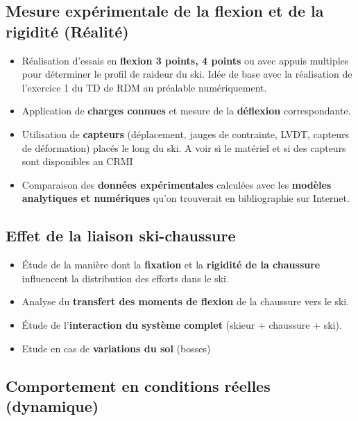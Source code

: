 \documentclass[12pt, a4paper]{article}
\begin{document}
\subsection{Mesure expérimentale de la flexion et de la rigidité (Réalité)}

\begin{itemize}
  \item Réalisation d'essais en \textbf{flexion 3 points, 4 points} ou avec appuis multiples pour déterminer le profil de raideur du ski. Idée de base avec la réalisation de l'exercice 1 du TD de RDM au préalable numériquement.
  \item Application de \textbf{charges connues} et mesure de la \textbf{déflexion} correspondante.
  \item Utilisation de \textbf{capteurs} (déplacement, jauges de contrainte, LVDT, capteurs de déformation) placés le long du ski. A voir si le matériel et si des capteurs sont disponibles au CRMI
  \item Comparaison des \textbf{données expérimentales} calculées avec les \textbf{modèles analytiques et numériques} qu'on trouverait en bibliographie sur Internet.
\end{itemize}

\subsection{Effet de la liaison ski-chaussure}

\begin{itemize}
  \item Étude de la manière dont la \textbf{fixation} et la \textbf{rigidité de la chaussure} influencent la distribution des efforts dans le ski.
  \item Analyse du \textbf{transfert des moments de flexion} de la chaussure vers le ski.
  \item Étude de l'\textbf{interaction du système complet} (skieur + chaussure + ski).
  \item   Etude en cas de \textbf{variations du sol} (bosses)
\end{itemize}

\subsection{Comportement en conditions réelles (dynamique)}
\end{document}
